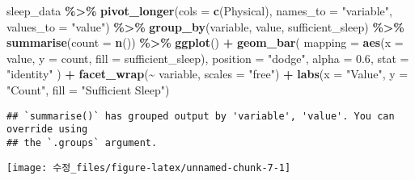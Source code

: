 \documentclass[
  11pt,
]{article}
\newenvironment{Shaded}{\begin{snugshade}}{\end{snugshade}}
\newcommand{\AttributeTok}[1]{\textcolor[rgb]{0.13,0.29,0.53}{#1}}
\newcommand{\FloatTok}[1]{\textcolor[rgb]{0.00,0.00,0.81}{#1}}
\newcommand{\FunctionTok}[1]{\textcolor[rgb]{0.13,0.29,0.53}{\textbf{#1}}}
\newcommand{\NormalTok}[1]{#1}
\newcommand{\SpecialCharTok}[1]{\textcolor[rgb]{0.81,0.36,0.00}{\textbf{#1}}}
\newcommand{\StringTok}[1]{\textcolor[rgb]{0.31,0.60,0.02}{#1}}
\begin{document}
\begin{Shaded}
\begin{Highlighting}[]
\NormalTok{sleep\_data }\SpecialCharTok{\%\textgreater{}\%}
  \FunctionTok{pivot\_longer}\NormalTok{(}\AttributeTok{cols =} \FunctionTok{c}\NormalTok{(Physical), }\AttributeTok{names\_to =} \StringTok{"variable"}\NormalTok{, }\AttributeTok{values\_to =} \StringTok{"value"}\NormalTok{) }\SpecialCharTok{\%\textgreater{}\%}
  \FunctionTok{group\_by}\NormalTok{(variable, value, sufficient\_sleep) }\SpecialCharTok{\%\textgreater{}\%}
  \FunctionTok{summarise}\NormalTok{(}\AttributeTok{count =} \FunctionTok{n}\NormalTok{()) }\SpecialCharTok{\%\textgreater{}\%}
  \FunctionTok{ggplot}\NormalTok{() }\SpecialCharTok{+}
  \FunctionTok{geom\_bar}\NormalTok{(}
    \AttributeTok{mapping =} \FunctionTok{aes}\NormalTok{(}\AttributeTok{x =}\NormalTok{ value, }\AttributeTok{y =}\NormalTok{ count, }\AttributeTok{fill =}\NormalTok{ sufficient\_sleep),}
    \AttributeTok{position =} \StringTok{"dodge"}\NormalTok{, }
    \AttributeTok{alpha =} \FloatTok{0.6}\NormalTok{,}
    \AttributeTok{stat =} \StringTok{"identity"}
\NormalTok{  ) }\SpecialCharTok{+}
  \FunctionTok{facet\_wrap}\NormalTok{(}\SpecialCharTok{\textasciitilde{}}\NormalTok{ variable, }\AttributeTok{scales =} \StringTok{"free"}\NormalTok{) }\SpecialCharTok{+}
  \FunctionTok{labs}\NormalTok{(}\AttributeTok{x =} \StringTok{"Value"}\NormalTok{, }\AttributeTok{y =} \StringTok{"Count"}\NormalTok{, }\AttributeTok{fill =} \StringTok{"Sufficient Sleep"}\NormalTok{)}
\end{Highlighting}
\end{Shaded}

\begin{verbatim}
## `summarise()` has grouped output by 'variable', 'value'. You can override using
## the `.groups` argument.
\end{verbatim}

\begin{center}\texttt{[image: 수정\_files/figure-latex/unnamed-chunk-7-1]} \end{center}
\end{document}
